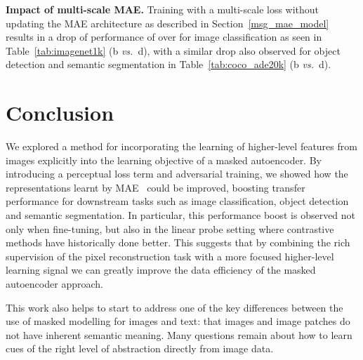 \documentclass[10pt,twocolumn,letterpaper, cta-author]{article}
\begin{document}
\textbf{Impact of multi-scale MAE. } Training with a multi-scale loss without updating the MAE architecture as described in Section~\ref{msg_mae_model} results in a drop of performance of over  for image classification as seen in Table~\ref{tab:imagenet1k} (b \emph{vs.}\ d), with a similar drop also observed for object detection and semantic segmentation in Table~\ref{tab:coco_ade20k} (b \emph{vs.}\ d).

\section{Conclusion}

We explored a method for incorporating the learning of higher-level features from images explicitly into the learning objective of a masked autoencoder. By introducing a perceptual loss term and adversarial training, we showed how the representations learnt by MAE~\cite{MaskedAutoencoders2021} could be improved, boosting transfer performance for downstream tasks such as image classification, object detection and semantic segmentation. In particular, this performance boost is observed not only when fine-tuning, but also in the linear probe setting where contrastive methods have historically done better. This suggests that by combining the rich supervision of the pixel reconstruction task with a more focused higher-level learning signal we can greatly improve the data efficiency of the masked autoencoder approach.

This work also helps to start to address one of the key differences between the use of masked modelling for images and text: that images and image patches do not have inherent semantic meaning. Many questions remain about how to learn cues of the right level of abstraction directly from image data.






{\small


}
\end{document}
